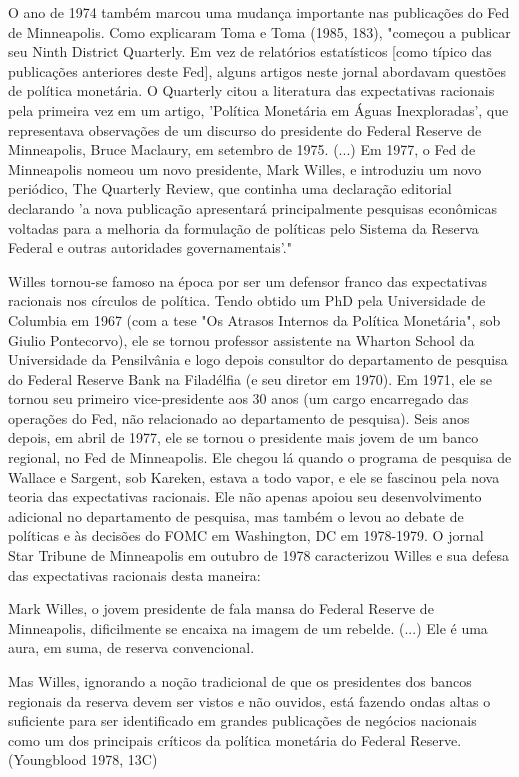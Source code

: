 \documentclass[12pt]{article}
\begin{document}
O ano de 1974 também marcou uma mudança importante nas publicações do Fed de Minneapolis. Como explicaram Toma e Toma (1985, 183), "começou a publicar seu Ninth District Quarterly. Em vez de relatórios estatísticos [como típico das publicações anteriores deste Fed], alguns artigos neste jornal abordavam questões de política monetária. O Quarterly citou a literatura das expectativas racionais pela primeira vez em um artigo, 'Política Monetária em Águas Inexploradas', que representava observações de um discurso do presidente do Federal Reserve de Minneapolis, Bruce Maclaury, em setembro de 1975. (...) Em 1977, o Fed de Minneapolis nomeou um novo presidente, Mark Willes, e introduziu um novo periódico, The Quarterly Review, que continha uma declaração editorial declarando 'a nova publicação apresentará principalmente pesquisas econômicas voltadas para a melhoria da formulação de políticas pelo Sistema da Reserva Federal e outras autoridades governamentais'."

Willes tornou-se famoso na época por ser um defensor franco das expectativas racionais nos círculos de política. Tendo obtido um PhD pela Universidade de Columbia em 1967 (com a tese "Os Atrasos Internos da Política Monetária", sob Giulio Pontecorvo), ele se tornou professor assistente na Wharton School da Universidade da Pensilvânia e logo depois consultor do departamento de pesquisa do Federal Reserve Bank na Filadélfia (e seu diretor em 1970). Em 1971, ele se tornou seu primeiro vice-presidente aos 30 anos (um cargo encarregado das operações do Fed, não relacionado ao departamento de pesquisa). Seis anos depois, em abril de 1977, ele se tornou o presidente mais jovem de um banco regional, no Fed de Minneapolis. Ele chegou lá quando o programa de pesquisa de Wallace e Sargent, sob Kareken, estava a todo vapor, e ele se fascinou pela nova teoria das expectativas racionais. Ele não apenas apoiou seu desenvolvimento adicional no departamento de pesquisa, mas também o levou ao debate de políticas e às decisões do FOMC em Washington, DC em 1978-1979. O jornal Star Tribune de Minneapolis em outubro de 1978 caracterizou Willes e sua defesa das expectativas racionais desta maneira:

Mark Willes, o jovem presidente de fala mansa do Federal Reserve de Minneapolis, dificilmente se encaixa na imagem de um rebelde. (...) Ele é uma aura, em suma, de reserva convencional.

Mas Willes, ignorando a noção tradicional de que os presidentes dos bancos regionais da reserva devem ser vistos e não ouvidos, está fazendo ondas altas o suficiente para ser identificado em grandes publicações de negócios nacionais como um dos principais críticos da política monetária do Federal Reserve. (Youngblood 1978, 13C)
\end{document}
